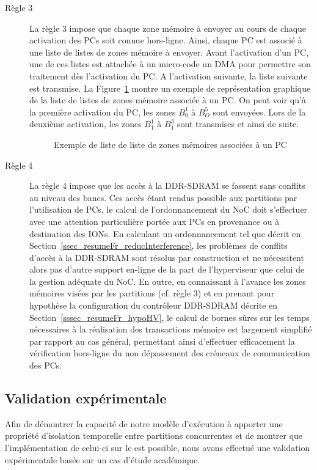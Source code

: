 \documentclass[main.tex]{subfiles}
\begin{document}
\begin{description}
    \item[Règle 3]
        La règle 3 impose que chaque zone mémoire à envoyer au cours de chaque activation des PCs soit connue hors-ligne. Ainsi, chaque PC est associé à une liste de listes de zones mémoire à envoyer. Avant l'activation d'un PC, une de ces listes est attachée à un micro-code un DMA pour permettre son traitement dès l'activation du PC. A l'activation suivante, la liste suivante est transmise. La Figure~\ref{fig_resumeFr_exBufferQueues} montre un exemple de représentation graphique de la liste de listes de zones mémoire associée à un PC. On peut voir qu'à la première activation du PC, les zones $B_0^1$ à $B_O^5$ sont envoyées. Lors de la deuxième activation, les zones $B_1^1$ à $B_1^3$ sont transmises et ainsi de suite.
            \begin{figure}
                \centering
                \scalebox{0.75}{}
                \caption{Exemple de liste de liste de zones mémoires associées à un PC}
                \label{fig_resumeFr_exBufferQueues}
            \end{figure}


    \item[Règle 4]
        La règle 4 impose que les accès à la DDR-SDRAM se fassent sans conflits au niveau des bancs. Ces accès étant rendus possible aux partitions par l'utilisation de PCs, le calcul de l'ordonnancement du NoC doit s'effectuer avec une attention particulière portée aux PCs en provenance ou à destination des IONs. En calculant un ordonnancement tel que décrit en Section~\ref{ssec_resumeFr_reducInterference}, les problèmes de conflits d'accès à la DDR-SDRAM sont résolus par construction et ne nécessitent alors pas d'autre support en-ligne de la part de l'hyperviseur que celui de la gestion adéquate du NoC. En outre, en connaissant à l'avance les zones mémoires visées par les partitions (cf. règle 3) et en prenant pour hypothèse la configuration du contrôleur DDR-SDRAM décrite en Section~\ref{sssec_resumeFr_hypoHV}, le calcul de bornes sûres sur les temps nécessaires à la réalisation des transactions mémoire est largement simplifié par rapport au cas général, permettant ainsi d'effectuer efficacement la vérification hors-ligne du non dépassement des créneaux de communication des PCs.
\end{description}

\subsection{Validation expérimentale}
Afin de démontrer la capacité de notre modèle d'exécution à apporter une propriété d'isolation temporelle entre partitions concurrentes et de montrer que l'implémentation de celui-ci sur le \mppalong est possible, nous avons effectué une validation expérimentale basée sur un cas d'étude académique.
\end{document}
